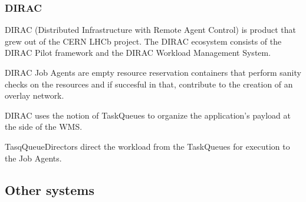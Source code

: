 \documentclass{sig-alternate}
\begin{document}



\subsubsection{DIRAC}

DIRAC (Distributed Infrastructure with Remote Agent Control) is product that
grew out of the CERN LHCb project\cite{diracgrid2004}.
The DIRAC ecosystem consists of the DIRAC Pilot framework and the DIRAC
Workload Management System.

DIRAC Job Agents are empty resource reservation containers that perform sanity checks
on the resources and if succesful in that, contribute to the creation of an
overlay network.

DIRAC uses the notion of TaskQueues to organize the application's payload at
the side of the WMS.

TasqQueueDirectors direct the workload from the TaskQueues for execution to the
Job Agents.

\subsection{Other systems}
\end{document}
